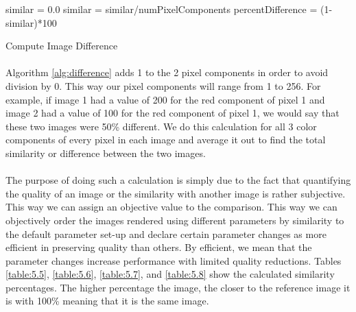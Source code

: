 \begin{algorithm}[H]
 \SetAlgoLined
 similar = 0.0\;
 similar = similar/numPixelComponents\;
 percentDifference = (1-similar)*100\;
 \caption{Compute Image Difference}
 \label{alg:difference}
\end{algorithm}

\paragraph{}
Algorithm \ref{alg:difference} adds 1 to the 2 pixel components in order to avoid division by 0.  This way our pixel components will range from 1 to 256.  For example, if image 1 had a value of 200 for the red component of pixel 1 and image 2 had a value of 100 for the red component of pixel 1, we would say that these two images were 50\% different.  We do this calculation for all 3 color components of every pixel in each image and average it out to find the total similarity or difference between the two images.

\paragraph{}
The purpose of doing such a calculation is simply due to the fact that quantifying the quality of an image or  the similarity with another image is rather subjective.  This way we can assign an objective value to the comparison.  This way we can objectively order the images rendered using different parameters by similarity to the default parameter set-up and declare certain parameter changes as more efficient in preserving quality than others.  By efficient, we mean that the parameter changes increase performance with limited quality reductions.  Tables \ref{table:5.5}, \ref{table:5.6}, \ref{table:5.7}, and \ref{table:5.8} show the calculated similarity percentages.  The higher percentage the image, the closer to the reference image it is with 100\% meaning that it is the same image.


